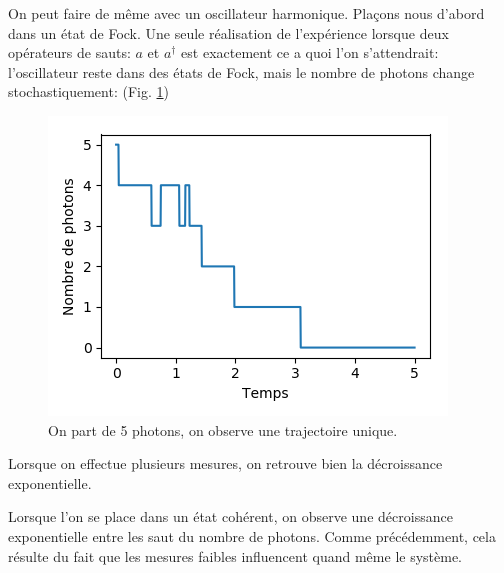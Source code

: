 \documentclass[11pt,a4paper]{article}
\begin{document}
	On peut faire de même avec un oscillateur harmonique. Plaçons nous d'abord dans un état de Fock. Une seule réalisation de l'expérience lorsque deux opérateurs de sauts: $a$ et $a^{\dagger}$ est exactement ce a quoi l'on s'attendrait: l'oscillateur reste dans des états de Fock, mais le nombre de photons change stochastiquement: (Fig. \ref{fig:U_Fock_deco_1})
	\begin{figure}
		\centering
		\includegraphics[width=0.7\linewidth]{U_Fock_deco_1}
		\caption{On part de 5 photons, on observe une trajectoire unique.}
		\label{fig:U_Fock_deco_1}
	\end{figure}

	Lorsque on effectue plusieurs mesures, on retrouve bien la décroissance exponentielle.
	
	Lorsque l'on se place dans un état cohérent, on observe une décroissance exponentielle entre les saut du nombre de photons. Comme précédemment, cela résulte du fait que les mesures faibles influencent quand même le système.
	
\end{document}
